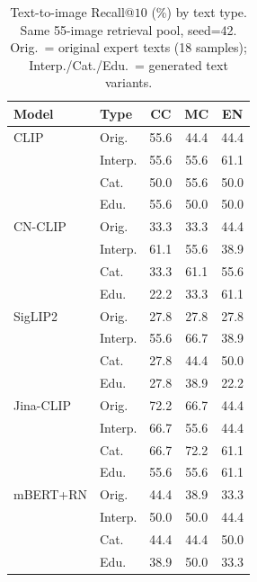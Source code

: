 \begin{table}[t]
\centering
\caption{Text-to-image Recall@$10$ (\%) by text type. Same 55-image retrieval pool, seed=42. Orig.\ = original expert texts (18 samples); Interp./Cat./Edu.\ = generated text variants.}
\label{tab:text_type_comparison}
\small
\setlength{\tabcolsep}{4pt}
\begin{tabular}{l l ccc}
\toprule
\textbf{Model} & \textbf{Type} & \textbf{CC} & \textbf{MC} & \textbf{EN} \\
\midrule
CLIP & Orig. & 55.6 & 44.4 & 44.4 \\
 & Interp. & 55.6 & 55.6 & 61.1 \\
 & Cat. & 50.0 & 55.6 & 50.0 \\
 & Edu. & 55.6 & 50.0 & 50.0 \\
\addlinespace[3pt]
CN-CLIP & Orig. & 33.3 & 33.3 & 44.4 \\
 & Interp. & 61.1 & 55.6 & 38.9 \\
 & Cat. & 33.3 & 61.1 & 55.6 \\
 & Edu. & 22.2 & 33.3 & 61.1 \\
\addlinespace[3pt]
SigLIP2 & Orig. & 27.8 & 27.8 & 27.8 \\
 & Interp. & 55.6 & 66.7 & 38.9 \\
 & Cat. & 27.8 & 44.4 & 50.0 \\
 & Edu. & 27.8 & 38.9 & 22.2 \\
\addlinespace[3pt]
Jina-CLIP & Orig. & 72.2 & 66.7 & 44.4 \\
 & Interp. & 66.7 & 55.6 & 44.4 \\
 & Cat. & 66.7 & 72.2 & 61.1 \\
 & Edu. & 55.6 & 55.6 & 61.1 \\
\addlinespace[3pt]
mBERT+RN & Orig. & 44.4 & 38.9 & 33.3 \\
 & Interp. & 50.0 & 50.0 & 44.4 \\
 & Cat. & 44.4 & 44.4 & 50.0 \\
 & Edu. & 38.9 & 50.0 & 33.3 \\
\bottomrule
\end{tabular}
\end{table}